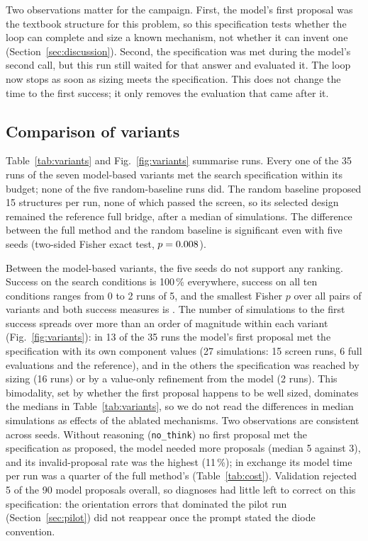 \documentclass[journal]{IEEEtran}
\begin{document}
Two observations matter for the campaign. First, the model's first proposal was the textbook structure
for this problem, so this specification tests whether the loop can complete and size a known
mechanism, not whether it can invent one (Section~\ref{sec:discussion}). Second, the specification was
met during the model's second call, but this run still waited for that answer and evaluated it. The
loop now stops as soon as sizing meets the specification. This does not change the time to the first
success; it only removes the evaluation that came after it.

\subsection{Comparison of variants}
Table~\ref{tab:variants} and Fig.~\ref{fig:variants} summarise \NRuns{} runs.
Every one of the 35 runs of the seven model-based variants met the
search specification within its budget; none of the five random-baseline runs did. The random baseline
proposed 15 structures per run, none of which passed the screen, so its selected design remained the
reference full bridge, after a median of \RandomMedianSims{} simulations. The difference between the full
method and the random baseline is significant even with five seeds (two-sided Fisher exact test,
$p=0.008{}$).

Between the model-based variants, the five seeds do not support any ranking. Success on the search
conditions is 100\,\% everywhere, success on all ten conditions ranges from 0 to 2 runs of 5, and the
smallest Fisher $p$ over all pairs of variants and both success measures is \MinPairP{}. The number of
simulations to the first success spreads over more than an order of magnitude within each variant
(Fig.~\ref{fig:variants}): in 13 of the 35 runs the model's first proposal met the specification with its
own component values (27 simulations: 15 screen runs, 6 full evaluations and the reference), and in the
others the specification was reached by sizing (16 runs) or by a value-only refinement from the model (2
runs). This bimodality, set by whether the first proposal happens to be well sized, dominates the medians
in Table~\ref{tab:variants}, so we do not read the differences in median simulations as effects of the
ablated mechanisms. Two observations are consistent across seeds. Without reasoning (\texttt{no\_think})
no first proposal met the specification as proposed, the model needed more proposals (median 5 against
3), and its invalid-proposal rate was the highest (11\,\%); in exchange its model time per run was a
quarter of the full method's (Table~\ref{tab:cost}). Validation rejected 5 of the 90 model proposals
overall, so diagnoses had little left to correct on this specification: the orientation errors that
dominated the pilot run (Section~\ref{sec:pilot}) did not reappear once the prompt stated the diode
convention.
\end{document}

